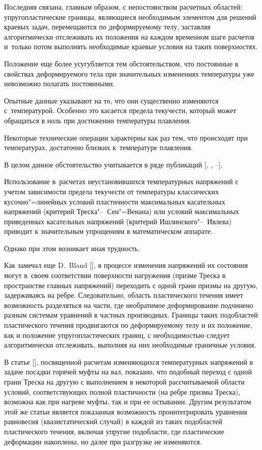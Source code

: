 Последняя связана, главным образом, с непостоянством расчетных областей: упругопластические границы, являющиеся необходимым элементом для решений краевых задач, перемещаются по деформируемому телу, заставляя алгоритмически отслеживать их положения на каждом временном шаге расчетов и~только потом выполнять необходимые краевые условия на таких поверхностях. 



Положение еще более усугубляется тем обстоятельством, что постоянные в свойствах деформируемого тела при значительных изменениях температуры уже невозможно полагать постоянными. 

Опытные данные указывают на то, что они существенно изменяются с~температурой.  Особенно это касается предела текучести, который может обращаться в ноль при достижении температуры плавления. 

Некоторые технические операции характерны как раз тем, что происходят при температурах, достаточно близких к~температуре плавления. 



В целом данное обстоятельство учитывается в ряде публикаций  [, , --]. 

Использование в~расчетах неустановившихся температурных напряжений с учетом зависимости предела текучести от температуры классических кусочно"=линейных условий пластичности максимальных касательных напряжений (критерий Треска"--~Сен"=Венана) или условий максимальных приведенных касательных напряжений (критерий Ишлинского"--~Ивлева) приводит к значительным упрощениям в математическом аппарате. 

Однако при этом возникает иная трудность. 

Как замечал еще D.~Bland [], в процессе изменения напряжений их состояния могут в~своем соответствии поверхности нагружения (призме Треска в пространстве главных напряжений) переходить с одной грани призмы на другую, задерживаясь на ребре. Следовательно, область пластического течения имеет возможность разделяться на части, где необратимое деформирование подчинено разным системам уравнений в частных производных. Границы таких подобластей пластического течения продвигаются по деформируемому телу и их положение, как и положение упругопластических границ, с необходимостью следует алгоритмически отслеживать, выполняя на них необходимые граничные условия. 



В статье [], посвященной расчетам изменяющихся температурных напряжений в задаче посадки горячей муфты на вал, показано, что подобный переход с одной грани Треска на другую с выполнением в некоторой рассчитываемой области условий, соответствующих полной пластичности (на ребре призмы Треска), возможна как при нагреве муфты, так и при ее остывании. Другим результатом этой же статьи является показанная возможность проинтегрировать уравнения равновесия (квазистатический случай) в каждой из таких подобластей пластического течения, включая упругие подобласти, где пластические деформации накоплены, но далее при разгрузке не изменяются. 

